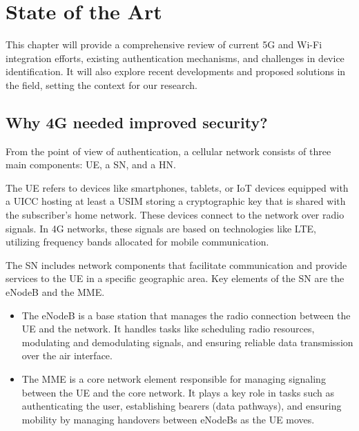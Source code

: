 \chapter{State of the Art}
\label{chapter:State of the Art}

\begin{introduction}
    This chapter will provide a comprehensive review of current \ac{5G} and Wi-Fi integration efforts, existing authentication mechanisms, and challenges in device identification. It will also explore recent developments and proposed solutions in the field, setting the context for our research.
\end{introduction}

\section{Why \ac{4G} needed improved security?}

From the point of view of authentication, a cellular network consists of three main components: \ac{UE}, a \ac{SN}, and a \ac{HN}.

The \ac{UE} refers to devices like smartphones, tablets, or IoT devices equipped with a \ac{UICC}  hosting at least a \ac{USIM} storing a cryptographic key that is shared with the subscriber’s home network. These devices connect to the network over radio signals. In \ac{4G} networks, these signals are based on technologies like \ac{LTE}, utilizing frequency bands allocated for mobile communication.

The \ac{SN} includes network components that facilitate communication and provide services to the \ac{UE} in a specific geographic area. Key elements of the \ac{SN} are the \ac{eNodeB} and the \ac{MME}.

\begin{itemize}
    \item{
                The \ac{eNodeB} is a base station that manages the radio connection between the \ac{UE} and the network. It handles tasks like scheduling radio resources, modulating and demodulating signals, and ensuring reliable data transmission over the air interface.
          }
    \item {
          The \ac{MME} is a core network element responsible for managing signaling between the \ac{UE} and the core network. It plays a key role in tasks such as authenticating the user, establishing bearers (data pathways), and ensuring mobility by managing handovers between \acp{eNodeB} as the \ac{UE} moves.
          }
\end{itemize}

